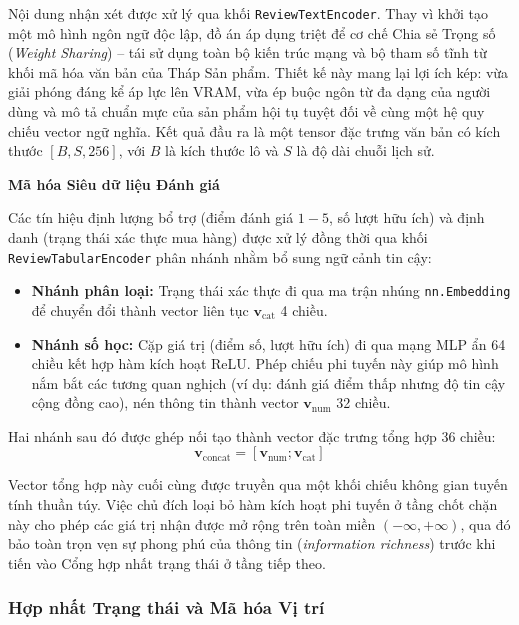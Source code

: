 Nội dung nhận xét được xử lý qua khối \texttt{ReviewTextEncoder}. Thay vì khởi tạo một mô hình ngôn ngữ độc lập, đồ án áp dụng triệt để cơ chế Chia sẻ Trọng số (\textit{Weight Sharing}) – tái sử dụng toàn bộ kiến trúc mạng và bộ tham số tĩnh từ khối mã hóa văn bản của Tháp Sản phẩm. Thiết kế này mang lại lợi ích kép: vừa giải phóng đáng kể áp lực lên VRAM, vừa ép buộc ngôn từ đa dạng của người dùng và mô tả chuẩn mực của sản phẩm hội tụ tuyệt đối về cùng một hệ quy chiếu vector ngữ nghĩa. Kết quả đầu ra là một tensor đặc trưng văn bản có kích thước $[B, S, 256]$, với $B$ là kích thước lô và $S$ là độ dài chuỗi lịch sử.

\vspace{0.3cm}
\noindent \textbf{Mã hóa Siêu dữ liệu Đánh giá}

Các tín hiệu định lượng bổ trợ (điểm đánh giá $1-5$, số lượt hữu ích) và định danh (trạng thái xác thực mua hàng) được xử lý đồng thời qua khối \texttt{ReviewTabularEncoder} phân nhánh nhằm bổ sung ngữ cảnh tin cậy:
\begin{itemize}
    \item \textbf{Nhánh phân loại:} Trạng thái xác thực đi qua ma trận nhúng \texttt{nn.Embedding} để chuyển đổi thành vector liên tục $\mathbf{v}_{\text{cat}}$ 4 chiều.
    \item \textbf{Nhánh số học:} Cặp giá trị (điểm số, lượt hữu ích) đi qua mạng MLP ẩn 64 chiều kết hợp hàm kích hoạt ReLU. Phép chiếu phi tuyến này giúp mô hình nắm bắt các tương quan nghịch (ví dụ: đánh giá điểm thấp nhưng độ tin cậy cộng đồng cao), nén thông tin thành vector $\mathbf{v}_{\text{num}}$ 32 chiều.
\end{itemize}

Hai nhánh sau đó được ghép nối tạo thành vector đặc trưng tổng hợp 36 chiều:
$$ \mathbf{v}_{\text{concat}} = [\mathbf{v}_{\text{num}}; \mathbf{v}_{\text{cat}}] $$

Vector tổng hợp này cuối cùng được truyền qua một khối chiếu không gian tuyến tính thuần túy. Việc chủ đích loại bỏ hàm kích hoạt phi tuyến ở tầng chốt chặn này cho phép các giá trị nhận được mở rộng trên toàn miền $(-\infty, +\infty)$, qua đó bảo toàn trọn vẹn sự phong phú của thông tin (\textit{information richness}) trước khi tiến vào Cổng hợp nhất trạng thái ở tầng tiếp theo.

\subsubsection{Hợp nhất Trạng thái và Mã hóa Vị trí}

